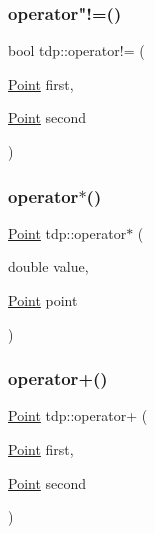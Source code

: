 \subsubsection{\texorpdfstring{operator"!=()}{operator!=()}}
{\footnotesize\ttfamily bool tdp\+::operator!= (\begin{DoxyParamCaption}\item[{\mbox{\hyperlink{structtdp_1_1_point}{Point}}}]{first,  }\item[{\mbox{\hyperlink{structtdp_1_1_point}{Point}}}]{second }\end{DoxyParamCaption})}

\mbox{\label{namespacetdp_ab3a99a4aa6185224eae95e30093c9946}} 
\subsubsection{\texorpdfstring{operator$\ast$()}{operator*()}}
{\footnotesize\ttfamily \mbox{\hyperlink{structtdp_1_1_point}{Point}} tdp\+::operator$\ast$ (\begin{DoxyParamCaption}\item[{double}]{value,  }\item[{\mbox{\hyperlink{structtdp_1_1_point}{Point}}}]{point }\end{DoxyParamCaption})}

\mbox{\label{namespacetdp_a34cf3e1ef508e6a115b6c1d24a5dbb5d}} 
\subsubsection{\texorpdfstring{operator+()}{operator+()}}
{\footnotesize\ttfamily \mbox{\hyperlink{structtdp_1_1_point}{Point}} tdp\+::operator+ (\begin{DoxyParamCaption}\item[{\mbox{\hyperlink{structtdp_1_1_point}{Point}}}]{first,  }\item[{\mbox{\hyperlink{structtdp_1_1_point}{Point}}}]{second }\end{DoxyParamCaption})}

\mbox{\label{namespacetdp_ab8dc4a4b6272d3a8ef06f22a5b07daec}} 
